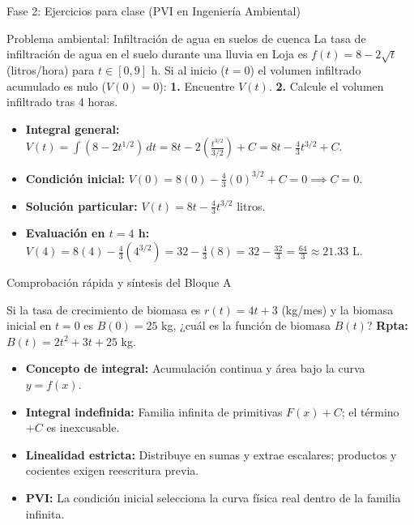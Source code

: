 \documentclass[aspectratio=169,11pt]{beamer}
\begin{document}
\begin{frame}{Fase 2: Ejercicios para clase (PVI en Ingeniería Ambiental)}
\small
\begin{block}{Problema ambiental: Infiltración de agua en suelos de cuenca}
\footnotesize
La tasa de infiltración de agua en el suelo durante una lluvia en Loja es $f(t) = 8 - 2\sqrt{t}$ (litros/hora) para $t \in [0, 9]$ h. Si al inicio ($t=0$) el volumen infiltrado acumulado es nulo ($V(0) = 0$):
\textbf{1.} Encuentre $V(t)$. \quad \textbf{2.} Calcule el volumen infiltrado tras 4 horas.
\end{block}
\vspace{0.04cm}
\begin{techbox}[title=Resolución detallada del PVI]
\footnotesize
\begin{itemize}[itemsep=1.5pt]
  \item \textbf{Integral general:} $V(t) = \int (8 - 2t^{1/2})\,dt = 8t - 2\left(\frac{t^{3/2}}{3/2}\right) + C = 8t - \frac{4}{3}t^{3/2} + C$.
  \item \textbf{Condición inicial:} $V(0) = 8(0) - \frac{4}{3}(0)^{3/2} + C = 0 \implies C = 0$.
  \item \textbf{Solución particular:} $V(t) = 8t - \frac{4}{3}t^{3/2}$ litros.
  \item \textbf{Evaluación en $t=4$ h:} $V(4) = 8(4) - \frac{4}{3}(4^{3/2}) = 32 - \frac{4}{3}(8) = 32 - \frac{32}{3} = \frac{64}{3} \approx 21.33\text{ L}$.
\end{itemize}
\end{techbox}
\end{frame}

\begin{frame}{Comprobación rápida y síntesis del Bloque A}
\small
\begin{checkbox}[title=Pregunta de verificación conceptual]
\footnotesize
Si la tasa de crecimiento de biomasa es $r(t) = 4t + 3$ (kg/mes) y la biomasa inicial en $t=0$ es $B(0) = 25$ kg, ¿cuál es la función de biomasa $B(t)$?
\hfill \textbf{Rpta:} $B(t) = 2t^2 + 3t + 25$ kg.
\end{checkbox}
\vspace{0.04cm}
\begin{techbox}[title=Síntesis conceptual del Bloque A]
\footnotesize
\begin{itemize}[itemsep=1.5pt]
  \item \textbf{Concepto de integral:} Acumulación continua y área bajo la curva $y=f(x)$.
  \item \textbf{Integral indefinida:} Familia infinita de primitivas $F(x)+C$; el término $+C$ es inexcusable.
  \item \textbf{Linealidad estricta:} Distribuye en sumas y extrae escalares; productos y cocientes exigen reescritura previa.
  \item \textbf{PVI:} La condición inicial selecciona la curva física real dentro de la familia infinita.
\end{itemize}
\end{techbox}
\end{frame}
\end{document}

